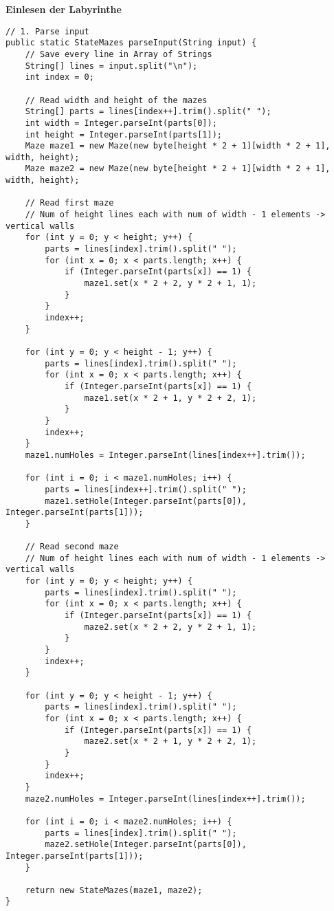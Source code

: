 \documentclass[a4paper,10pt,ngerman]{scrartcl}
\begin{document}
\textbf{Einlesen der Labyrinthe}
\begin{lstlisting}
// 1. Parse input
public static StateMazes parseInput(String input) {
    // Save every line in Array of Strings
    String[] lines = input.split("\n");
    int index = 0;

    // Read width and height of the mazes
    String[] parts = lines[index++].trim().split(" ");
    int width = Integer.parseInt(parts[0]);
    int height = Integer.parseInt(parts[1]);
    Maze maze1 = new Maze(new byte[height * 2 + 1][width * 2 + 1], width, height);
    Maze maze2 = new Maze(new byte[height * 2 + 1][width * 2 + 1], width, height);

    // Read first maze
    // Num of height lines each with num of width - 1 elements -> vertical walls
    for (int y = 0; y < height; y++) {
        parts = lines[index].trim().split(" ");
        for (int x = 0; x < parts.length; x++) {
            if (Integer.parseInt(parts[x]) == 1) {
                maze1.set(x * 2 + 2, y * 2 + 1, 1);
            }
        }
        index++;
    }

    for (int y = 0; y < height - 1; y++) {
        parts = lines[index].trim().split(" ");
        for (int x = 0; x < parts.length; x++) {
            if (Integer.parseInt(parts[x]) == 1) {
                maze1.set(x * 2 + 1, y * 2 + 2, 1);
            }
        }
        index++;
    }
    maze1.numHoles = Integer.parseInt(lines[index++].trim());

    for (int i = 0; i < maze1.numHoles; i++) {
        parts = lines[index++].trim().split(" ");
        maze1.setHole(Integer.parseInt(parts[0]), Integer.parseInt(parts[1]));
    }

    // Read second maze
    // Num of height lines each with num of width - 1 elements -> vertical walls
    for (int y = 0; y < height; y++) {
        parts = lines[index].trim().split(" ");
        for (int x = 0; x < parts.length; x++) {
            if (Integer.parseInt(parts[x]) == 1) {
                maze2.set(x * 2 + 2, y * 2 + 1, 1);
            }
        }
        index++;
    }

    for (int y = 0; y < height - 1; y++) {
        parts = lines[index].trim().split(" ");
        for (int x = 0; x < parts.length; x++) {
            if (Integer.parseInt(parts[x]) == 1) {
                maze2.set(x * 2 + 1, y * 2 + 2, 1);
            }
        }
        index++;
    }
    maze2.numHoles = Integer.parseInt(lines[index++].trim());

    for (int i = 0; i < maze2.numHoles; i++) {
        parts = lines[index].trim().split(" ");
        maze2.setHole(Integer.parseInt(parts[0]), Integer.parseInt(parts[1]));
    }

    return new StateMazes(maze1, maze2);
}
\end{lstlisting}
\end{document}
